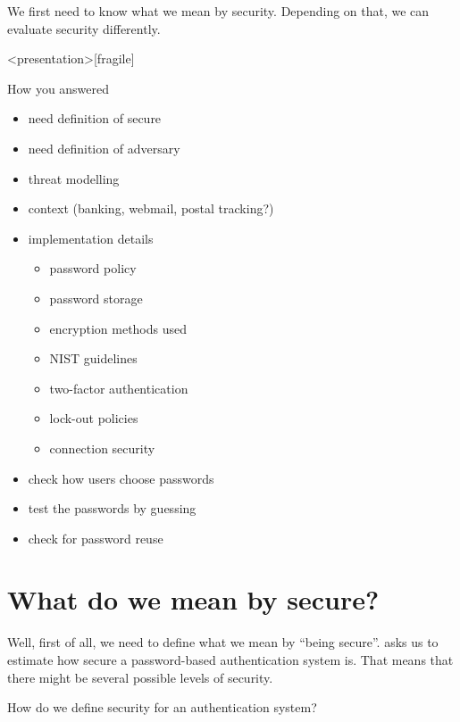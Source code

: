 We first need to know what we mean by security.
Depending on that, we can evaluate security differently.

\begin{frame}<presentation>[fragile]
  \begin{block}{How you answered}
  \begin{itemize}
    \item need definition of secure
    \item need definition of adversary
    \item threat modelling
    \item context (banking, webmail, postal tracking?)
    \item implementation details
      \begin{itemize}
        \item password policy
        \item password storage
        \item encryption methods used
        \item NIST guidelines
        \item two-factor authentication
        \item lock-out policies
        \item connection security
      \end{itemize}
    \item check how users choose passwords
    \item test the passwords by guessing
    \item check for password reuse
  \end{itemize}
  \end{block}
\end{frame}

\section{What do we mean by secure?}

Well, first of all, we need to define what we mean by \enquote{being secure}.
 asks us to estimate how secure a password-based authentication system 
is.
That means that there might be several possible levels of security.

\begin{frame}[fragile]
  \begin{exercise}
    How do we define security for an authentication system?
  \end{exercise}
\end{frame}

